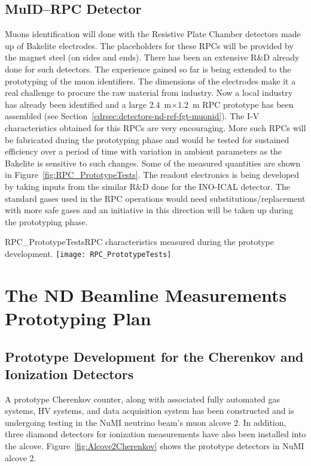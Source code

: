 \subsection{MuID--RPC Detector}   


Muons identification will done with the Resistive Plate Chamber
detectors made up of Bakelite electrodes.  The placeholders for these
RPCs will be provided by the magnet steel (on sides and ends). There
has been an extensive R\&D already done for such detectors. The
experience gained so far is being extended to the prototyping of the
muon identifiers. The dimensions of the electrodes make it a real
challenge to procure the raw material from industry. Now a local
industry has already been identified and a large 2.4~m$\times$1.2~m
RPC prototype has been assembled (see
Section~\ref{cdrsec:detectors-nd-ref-fgt-muonid}). The I-V
characteristics obtained for this RPCs are very encouraging. More such
RPCs will be fabricated during the prototyping phase and would be
tested for sustained efficiency over a period of time with variation
in ambient parameters as the Bakelite is sensitive to such
changes. Some of the measured quantities are shown in
Figure~\ref{fig:RPC_PrototypeTests}.  The readout electronics is being
developed by taking inputs from the similar R\&D done for the INO-ICAL
detector. The standard gases used in the RPC operations would need
substitutions/replacement with more safe gases and an initiative in
this direction will be taken up during the prototyping phase.
\begin{cdrfigure}  
{RPC_PrototypeTests}{RPC characteristics measured during the prototype development.}  
\texttt{[image: RPC\_PrototypeTests]}
\end{cdrfigure}



\section{The ND Beamline Measurements Prototyping Plan} 
\label{sec:proto-nd-blm}

\subsection{Prototype Development for the Cherenkov and Ionization Detectors}
\label{subsec:proto-blm-muon-cherenkov-proto}

A prototype Cherenkov counter, along with associated fully automated
gas systems, HV systems, and data acquisition system has been
constructed and is undergoing testing in the NuMI neutrino beam's muon
alcove 2. In addition, three diamond detectors\cite{ref:CERNdiamond}
for ionization measurements have also been installed into the alcove.
Figure~\ref{fig:Alcove2Cherenkov} shows the prototype detectors in
NuMI alcove 2.

